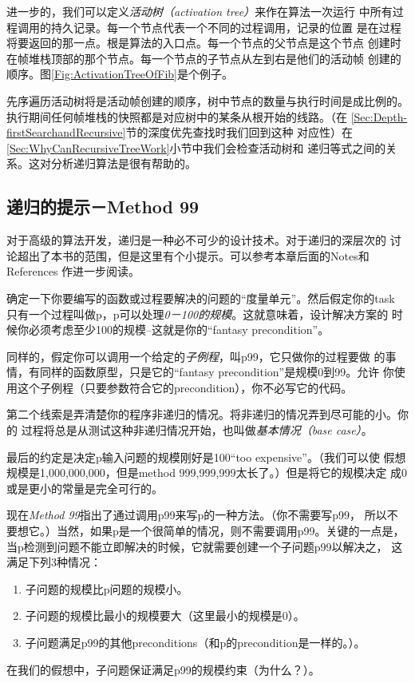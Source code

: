 进一步的，我们可以定义\emph{活动树（activation tree）}来作在算法一次运行
中所有过程调用的持久记录。每一个节点代表一个不同的过程调用，记录的位置
是在过程将要返回的那一点。根是算法的入口点。每一个节点的父节点是这个节点
创建时在帧堆栈顶部的那个节点。每一个节点的子节点从左到右是他们的活动帧
创建的顺序。图\ref{Fig:ActivationTreeOfFib}是个例子。

先序遍历活动树将是活动帧创建的顺序，树中节点的数量与执行时间是成比例的。
执行期间任何帧堆栈的快照都是对应树中的某条从根开始的线路。（在
\ref{Sec:Depth-firstSearchandRecursive}节的深度优先查找时我们回到这种
对应性）在\ref{Sec:WhyCanRecursiveTreeWork}小节中我们会检查活动树和
递归等式之间的关系。这对分析递归算法是很有帮助的。

\subsection{递归的提示－Method 99}\label{Sec:HintsForRecursionMethod99}
对于高级的算法开发，递归是一种必不可少的设计技术。对于递归的深层次的
讨论超出了本书的范围，但是这里有个小提示。可以参考本章后面的Notes和References
作进一步阅读。

确定一下你要编写的函数或过程要解决的问题的“度量单元”。然后假定你的task
只有一个过程叫做p，p可以处理\emph{0－100的规模}。这就意味着，设计解决方案的
时候你必须考虑至少100的规模--这就是你的“fantasy precondition”。

同样的，假定你可以调用一个给定的\emph{子例程}，叫p99，它只做你的过程要做
的事情，有同样的函数原型，只是它的“fantasy precondition”是规模0到99。允许
你使用这个子例程（只要参数符合它的precondition），你不必写它的代码。

第二个线索是弄清楚你的程序非递归的情况。将非递归的情况弄到尽可能的小。你的
过程将总是从测试这种非递归情况开始，也叫做\emph{基本情况（base case）}。

最后的约定是决定p输入问题的规模刚好是100“too expensive”。（我们可以使
假想规模是1,000,000,000，但是method 999,999,999太长了。）但是将它的规模决定
成0或是更小的常量是完全可行的。

现在\emph{Method 99}指出了通过调用p99来写p的一种方法。（你不需要写p99，
所以不要想它。）当然，如果p是一个很简单的情况，则不需要调用p99。关键的一点是，
当p检测到问题不能立即解决的时候，它就需要创建一个子问题p99以解决之，
这满足下列3种情况：
\begin{enumerate}
\item 子问题的规模比p问题的规模小。
\item 子问题的规模比最小的规模要大（这里最小的规模是0）。
\item 子问题满足p99的其他preconditions（和p的precondition是一样的。）。
\end{enumerate}
在我们的假想中，子问题保证满足p99的规模约束（为什么？）。

